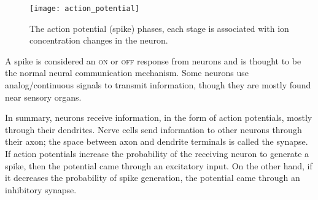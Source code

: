 \begin{figure}[hbt]
  \begin{center}
    \texttt{[image: action\_potential]}
    \caption{The action potential (spike) phases, each stage is associated with ion concentration changes in the neuron.}
    \label{fig:neuro:spike}
  \end{center}
\end{figure}

A spike is considered an \textsc{on} or \textsc{off} response from neurons and is thought to be the normal neural communication mechanism. Some neurons use analog/continuous signals to transmit information, though they are mostly found near sensory organs.

In summary, neurons receive information, in the form of action potentials, mostly through their dendrites. Nerve cells send information to other neurons through their axon; the space between axon and dendrite terminals is called the synapse. If action potentials increase the probability of the receiving neuron to generate a spike, then the potential came through an excitatory input. On the other hand, if it decreases the probability of spike generation, the potential came through an inhibitory synapse.


